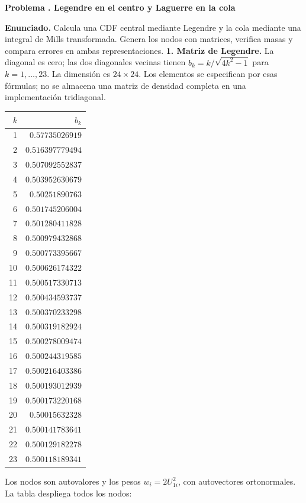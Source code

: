 \documentclass[11pt,a4paper]{article}
\theoremstyle{definition}
\newcounter{problema}
\newenvironment{resuelto}[1]{\refstepcounter{problema}\par\medskip\Needspace{6\baselineskip}\textbf{Problema \theproblema. #1}\par}{\par\medskip}
\begin{document}
\begin{resuelto}{Legendre en el centro y Laguerre en la cola}
\textbf{Enunciado.} Calcula una CDF central mediante Legendre y la cola mediante una integral de Mills transformada. Genera los nodos con matrices, verifica masas y compara errores en ambas representaciones.
\textbf{1. Matriz de Legendre.} La diagonal es cero; las dos diagonales vecinas tienen $b_k=k/\sqrt{4k^2-1}$ para $k=1,\ldots,23$. La dimensión es $24\times24$. Los elementos se especifican por esas fórmulas; no se almacena una matriz de densidad completa en una implementación tridiagonal.

\begin{center}\small\begin{tabular}{rr}
\toprule
$k$&$b_k$\\
\midrule
1&$0.57735026919$\\
2&$0.516397779494$\\
3&$0.507092552837$\\
4&$0.503952630679$\\
5&$0.50251890763$\\
6&$0.501745206004$\\
7&$0.501280411828$\\
8&$0.500979432868$\\
9&$0.500773395667$\\
10&$0.500626174322$\\
11&$0.500517330713$\\
12&$0.500434593737$\\
13&$0.500370233298$\\
14&$0.500319182924$\\
15&$0.500278009474$\\
16&$0.500244319585$\\
17&$0.500216403386$\\
18&$0.500193012939$\\
19&$0.500173220168$\\
20&$0.50015632328$\\
21&$0.500141783641$\\
22&$0.500129182278$\\
23&$0.500118189341$\\
\bottomrule\end{tabular}\end{center}
Los nodos son autovalores y los pesos $w_i=2U_{1i}^2$, con autovectores ortonormales. La tabla despliega todos los nodos:


\end{resuelto}
\end{document}
